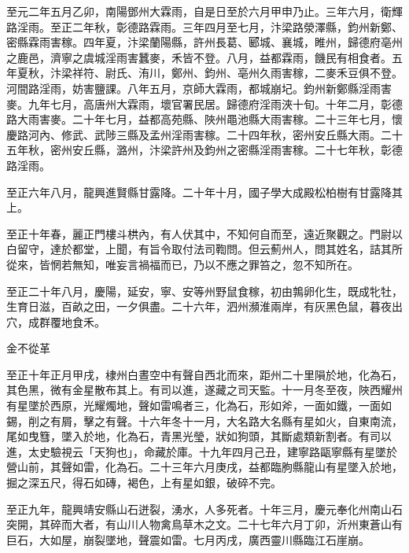 \begin{pinyinscope}
 至元二年五月乙卯，南陽鄧州大霖雨，自是日至於六月甲申乃止。三年六月，衛輝路淫雨。至正二年秋，彰德路霖雨。三年四月至七月，汴梁路滎澤縣，鈞州新鄭、密縣霖雨害稼。四年夏，汴梁蘭陽縣，許州長葛、郾城、襄城，睢州，歸德府亳州之鹿邑，濟寧之虞城淫雨害蠶麥，禾皆不登。八月，益都霖雨，饑民有相食者。五年夏秋，汴梁祥符、尉氏、洧川，鄭州、鈞州、亳州久雨害稼，二麥禾豆俱不登。河間路淫雨，妨害鹽課。八年五月，京師大霖雨，都城崩圮。鈞州新鄭縣淫雨害麥。九年七月，高唐州大霖雨，壞官署民居。歸德府淫雨浹十旬。十年二月，彰德路大雨害麥。二十年七月，益都高苑縣、陜州黽池縣大雨害稼。二十三年七月，懷慶路河內、修武、武陟三縣及孟州淫雨害稼。二十四年秋，密州安丘縣大雨。二十五年秋，密州安丘縣，潞州，汴梁許州及鈞州之密縣淫雨害稼。二十七年秋，彰德路淫雨。



 至正六年八月，龍興進賢縣甘露降。二十年十月，國子學大成殿松柏樹有甘露降其上。



 至正十年春，麗正門樓斗栱內，有人伏其中，不知何自而至，遠近聚觀之。門尉以白留守，達於都堂，上聞，有旨令取付法司鞫問。但云薊州人，問其姓名，詰其所從來，皆惘若無知，唯妄言禍福而已，乃以不應之罪笞之，忽不知所在。



 至正二十年八月，慶陽，延安，寧、安等州野鼠食稼，初由鶉卵化生，既成牝牡，生育日滋，百畝之田，一夕俱盡。二十六年，泗州瀕淮兩岸，有灰黑色鼠，暮夜出穴，成群覆地食禾。



 金不從革



 至正十年正月甲戌，棣州白晝空中有聲自西北而來，距州二十里隕於地，化為石，其色黑，微有金星散布其上。有司以進，遂藏之司天監。十一月冬至夜，陜西耀州有星墜於西原，光耀燭地，聲如雷鳴者三，化為石，形如斧，一面如鐵，一面如錫，削之有屑，擊之有聲。十六年冬十一月，大名路大名縣有星如火，自東南流，尾如曳篲，墜入於地，化為石，青黑光瑩，狀如狗頭，其斷處類新割者。有司以進，太史驗視云「天狗也」，命藏於庫。十九年四月己丑，建寧路甌寧縣有星墜於營山前，其聲如雷，化為石。二十三年六月庚戌，益都臨朐縣龍山有星墜入於地，掘之深五尺，得石如磚，褐色，上有星如銀，破碎不完。



 至正九年，龍興靖安縣山石迸裂，湧水，人多死者。十年三月，慶元奉化州南山石突開，其碎而大者，有山川人物禽鳥草木之文。二十七年六月丁卯，沂州東蒼山有巨石，大如屋，崩裂墜地，聲震如雷。七月丙戌，廣西靈川縣臨江石崖崩。




\end{pinyinscope}
